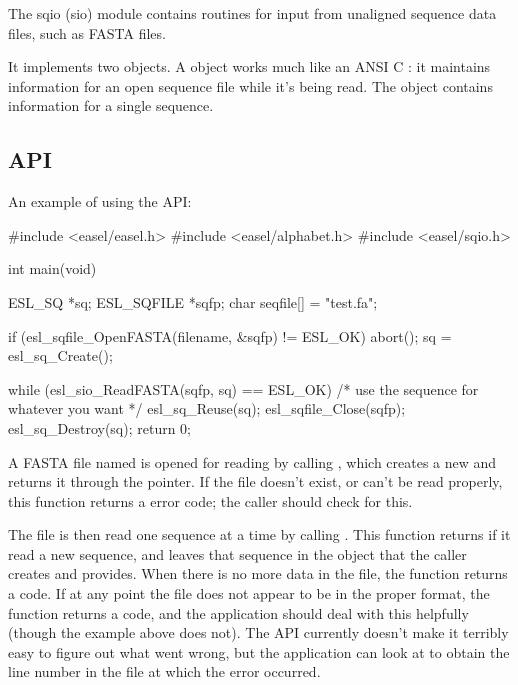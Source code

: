 
The sqio (sio) module contains routines for input from unaligned
sequence data files, such as FASTA files.

It implements two objects. A  object works much
like an ANSI C : it maintains information for an open
sequence file while it's being read. The  object
contains information for a single sequence.

\subsection{API}

An example of using the  API: 

\begin{cchunk}
#include <easel/easel.h>
#include <easel/alphabet.h>
#include <easel/sqio.h>

int
main(void)
{
  ESL_SQ     *sq;
  ESL_SQFILE *sqfp;
  char        seqfile[] = "test.fa";

  if (esl_sqfile_OpenFASTA(filename, &sqfp) != ESL_OK) abort();
  sq = esl_sq_Create();

  while (esl_sio_ReadFASTA(sqfp, sq) == ESL_OK)
  {
    /* use the sequence for whatever you want */
    esl_sq_Reuse(sq);
  }
  esl_sqfile_Close(sqfp);
  esl_sq_Destroy(sq);
  return 0;
}
\end{cchunk}


A FASTA file named  is opened for reading by calling
, which creates a new
 and returns it through the  pointer.
If the file doesn't exist, or can't be read properly, this function
returns a  error code; the caller should check for
this.

The file is then read one sequence at a time by calling
. This function returns
 if it read a new sequence, and leaves that sequence in
the  object that the caller creates and provides.  When
there is no more data in the file, the  function
returns a  code. If at any point the file does not
appear to be in the proper format, the  function
returns a  code, and the application should deal
with this helpfully (though the example above does not). The API
currently doesn't make it terribly easy to figure out what went wrong,
but the application can look at  to obtain the
line number in the file at which the error occurred.

